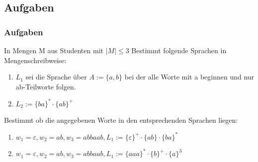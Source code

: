 \subsection{Aufgaben}
\begin{frame}
  \frametitle{Aufgaben}
  \begin{exampleblock}{In Mengen M aus Studenten mit $|M| \leq 3$}
      Bestimmt folgende Sprachen in Mengenschreibweise:
      \begin{enumerate}
        \item $L_1$ sei die Sprache über $A := \{a, b\}$ bei der alle Worte mit a beginnen und nur ab-Teilworte folgen.
        \item $L_2 := \{ba\}^* \cdot \{ab\}^+$
      \end{enumerate}
      Bestimmt ob die angegebenen Worte in den entsprechenden Sprachen liegen:
      \begin{enumerate}
        \item $w_1 = \varepsilon, w_2 = ab, w_3 = abbaab, L_1 := \{\varepsilon\}^+ \cdot \{ab\} \cdot \{ba\}^*$
        \item $w_1 = \varepsilon, w_2 = ab, w_3 = abbaab, L_1 := \{aaa\}^* \cdot \{b\}^+ \cdot \{a\}^3$
      \end{enumerate}
  \end{exampleblock}
\end{frame}
